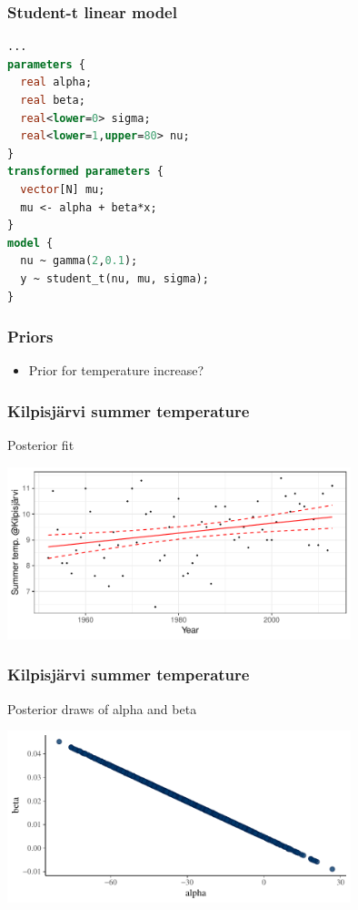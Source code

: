 \documentclass[10pt]{beamer}
\begin{document}
\begin{frame}[fragile]

\frametitle{Student-t linear model}
  {\small
  \begin{lstlisting}[language=Stan]
...
parameters {
  real alpha;
  real beta;
  real<lower=0> sigma;
  real<lower=1,upper=80> nu;
}
transformed parameters {
  vector[N] mu;
  mu <- alpha + beta*x;
}
model {
  nu ~ gamma(2,0.1);
  y ~ student_t(nu, mu, sigma);
}
  \end{lstlisting}
}
\end{frame}

\begin{frame}

\frametitle{Priors}

  \begin{itemize}
  \item Prior for temperature increase?
  \end{itemize}

\end{frame}

\begin{frame}

\frametitle{Kilpisjärvi summer temperature}

  Posterior fit

  \begin{center}
    \includegraphics[width=10cm]{figs/kilpis_lin_pfit.pdf}
  \end{center}

\end{frame}

\begin{frame}[fragile]

\frametitle{Kilpisjärvi summer temperature}

  Posterior draws of alpha and beta

  \begin{center}
    \includegraphics[width=10cm]{figs/kilpis_lin_mcmc_scatter.pdf}
  \end{center}

\end{frame}
\end{document}

